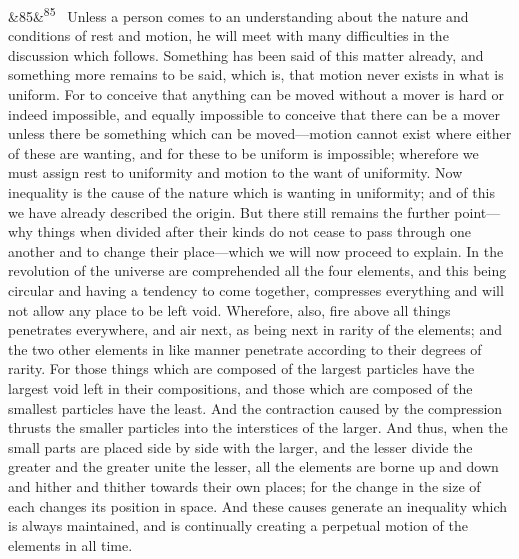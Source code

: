 \documentclass[12pt]{article}
\newcommand{\para}[1][]{\par\noindent\ifx&#1&\else\textsuperscript{\footnotesize #1}~\fi}
\begin{document}
\para[85] Unless a person comes to an understanding about the nature and conditions of rest and motion, he will meet with many difficulties in the discussion which follows. Something has been said of this matter already, and something more remains to be said, which is, that motion never exists in what is uniform. For to conceive that anything can be moved without a mover is hard or indeed impossible, and equally impossible to conceive that there can be a mover unless there be something which can be moved---motion cannot exist where either of these are wanting, and for these to be uniform is impossible; wherefore we must assign rest to uniformity and motion to the want of uniformity. Now inequality is the cause of the nature which is wanting in uniformity; and of this we have already described the origin. But there still remains the further point---why things when divided after their kinds do not cease to pass through one another and to change their place---which we will now proceed to explain. In the revolution of the universe are comprehended all the four elements, and this being circular and having a tendency to come together, compresses everything and will not allow any place to be left void. Wherefore, also, fire above all things penetrates everywhere, and air next, as being next in rarity of the elements; and the two other elements in like manner penetrate according to their degrees of rarity. For those things which are composed of the largest particles have the largest void left in their compositions, and those which are composed of the smallest particles have the least. And the contraction caused by the compression thrusts the smaller particles into the interstices of the larger. And thus, when the small parts are placed side by side with the larger, and the lesser divide the greater and the greater unite the lesser, all the elements are borne up and down and hither and thither towards their own places; for the change in the size of each changes its position in space. And these causes generate an inequality which is always maintained, and is continually creating a perpetual motion of the elements in all time.
\end{document}
